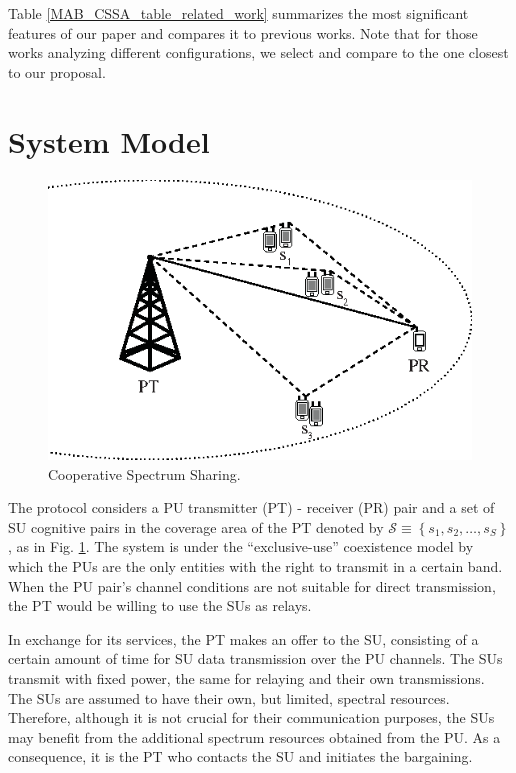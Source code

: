 Table \ref{MAB_CSSA_table_related_work} summarizes the most significant features of our paper and compares it to previous works. 
Note that for those works analyzing different configurations, we select and compare to the one closest to our proposal. 

\section{System Model}\label{sec:Sys}

\begin{figure}[!t]
\centering
\includegraphics{geo.eps}
\caption{Cooperative Spectrum Sharing.}
\label{fig:geo}
\end{figure}

The protocol considers a PU transmitter (PT) - receiver (PR) pair and a set of SU cognitive pairs in the coverage area of the PT denoted by $\mathcal{S}\equiv\left\{s_1,s_2,\ldots,s_S\right\}$, as in Fig. \ref{fig:geo}.
The system is under the ``exclusive-use'' coexistence model by which the PUs are the only entities with the right to transmit in a certain band. 
When the PU pair's channel conditions are not suitable for direct transmission, the PT would be willing to use the SUs as relays.

In exchange for its services, the PT makes an offer to the SU, consisting of a certain amount of time for SU data transmission over the PU channels. 
The SUs transmit with fixed power, the same for relaying and their own transmissions. 
The SUs are assumed to have their own, but limited, spectral resources. Therefore, although it is not crucial for their communication purposes, the SUs may benefit from the additional spectrum resources obtained from the PU.
As a consequence, it is the PT who contacts the SU and initiates the bargaining.


